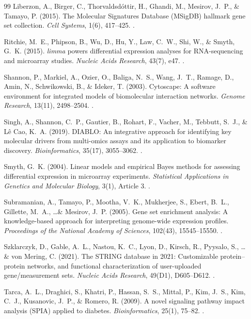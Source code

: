 \documentclass[11pt,oneside]{book}
\begin{document}
\begin{thebibliography}{99}
Liberzon, A., Birger, C., Thorvaldsd\'ottir, H., Ghandi, M., Mesirov, J.~P., \& Tamayo, P. (2015). The Molecular Signatures Database (MSigDB) hallmark gene set collection. \textit{Cell Systems}, 1(6), 417--425. .

Ritchie, M.~E., Phipson, B., Wu, D., Hu, Y., Law, C.~W., Shi, W., \& Smyth, G.~K. (2015). \textit{limma} powers differential expression analyses for RNA-sequencing and microarray studies. \textit{Nucleic Acids Research}, 43(7), e47. .

Shannon, P., Markiel, A., Ozier, O., Baliga, N.~S., Wang, J.~T., Ramage, D., Amin, N., Schwikowski, B., \& Ideker, T. (2003). Cytoscape: A software environment for integrated models of biomolecular interaction networks. \textit{Genome Research}, 13(11), 2498--2504. .

Singh, A., Shannon, C.~P., Gautier, B., Rohart, F., Vacher, M., Tebbutt, S.~J., \& L\^e Cao, K.~A. (2019). DIABLO: An integrative approach for identifying key molecular drivers from multi-omics assays and its application to biomarker discovery. \textit{Bioinformatics}, 35(17), 3055--3062. .

Smyth, G.~K. (2004). Linear models and empirical Bayes methods for assessing differential expression in microarray experiments. \textit{Statistical Applications in Genetics and Molecular Biology}, 3(1), Article 3. .

Subramanian, A., Tamayo, P., Mootha, V.~K., Mukherjee, S., Ebert, B.~L., Gillette, M.~A., \dots \& Mesirov, J.~P. (2005). Gene set enrichment analysis: A knowledge-based approach for interpreting genome-wide expression profiles. \textit{Proceedings of the National Academy of Sciences}, 102(43), 15545--15550. .

Szklarczyk, D., Gable, A.~L., Nastou, K.~C., Lyon, D., Kirsch, R., Pyysalo, S., \dots \& von Mering, C. (2021). The STRING database in 2021: Customizable protein--protein networks, and functional characterization of user-uploaded gene/measurement sets. \textit{Nucleic Acids Research}, 49(D1), D605--D612. .

Tarca, A.~L., Draghici, S., Khatri, P., Hassan, S.~S., Mittal, P., Kim, J.~S., Kim, C.~J., Kusanovic, J.~P., \& Romero, R. (2009). A novel signaling pathway impact analysis (SPIA) applied to diabetes. \textit{Bioinformatics}, 25(1), 75--82. .


\end{thebibliography}
\end{document}
